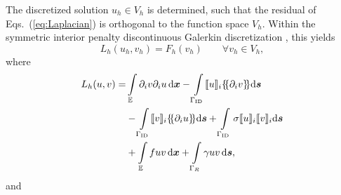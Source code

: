 The discretized solution $u_h\in V_h$ is determined, such that
  the residual of Eqs.~(\ref{eq:Laplacian}) is orthogonal to the function
  space $V_h$.  Within the symmetric interior penalty
  discontinuous Galerkin discretization \cite{arnold.d;brezzi.f;cockburn.b;marini.l2002,di2011mathematical}, this yields
%  
\begin{equation}
  L_h(u_h,v_h) = F_h(v_h) \qquad  \forall v_h \in V_h,
\end{equation}
%
where
%
%
\begin{align} 
  \label{eq:lh}
 \nonumber
 L_h(u,v)
 =&
 \int\displaylimits_{\mathbb{E}}  \partial_i v\partial_i u \,\mathrm{d}\tv{x}
 - \int\displaylimits_{\Gamma_{\rm ID}} \llbracket u \rrbracket_i \dgal*{\partial_i v}\mathrm{d}\tv s \\ \nonumber
 &
 - \int\displaylimits_{\Gamma_{\rm ID}} \llbracket v \rrbracket_i \dgal*{\partial_i u} \mathrm{d}\tv s
+\int\displaylimits_{\Gamma_{\rm ID}}\sigma \llbracket u \rrbracket_i \llbracket v \rrbracket_i \mathrm{d}\tv s  \\
&
+ \int\displaylimits_{\mathbb{E}} f u v \,\mathrm{d}\tv{x} + \int\displaylimits_{\Gamma_R} \gamma u v \,\mathrm{d}\tv s ,
\end{align}
%
and

